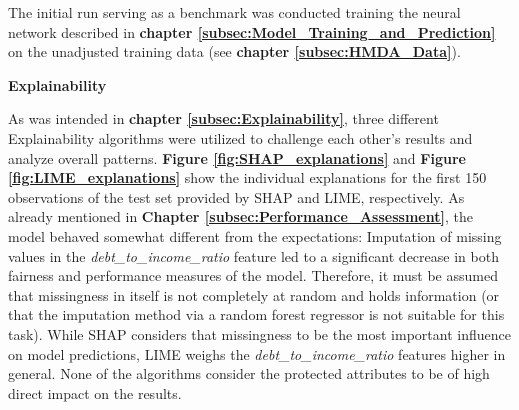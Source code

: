 The initial run serving as a benchmark was conducted training the neural network described in \textbf{chapter \ref{subsec:Model_Training_and_Prediction}} on the unadjusted training data (see \textbf{chapter \ref{subsec:HMDA_Data}}).

\textbf{Explainability}

As was intended in \textbf{chapter \ref{subsec:Explainability}}, three different Explainability algorithms were utilized to challenge each other's results and analyze overall patterns. \textbf{Figure \ref{fig:SHAP_explanations}} and \textbf{Figure \ref{fig:LIME_explanations}} show the individual explanations for the first 150 observations of the test set provided by SHAP and LIME, respectively. 
As already mentioned in \textbf{Chapter \ref{subsec:Performance_Assessment}}, the model behaved somewhat different from the expectations: Imputation of missing values in the \textit{debt\_to\_income\_ratio} feature led to a significant decrease in both fairness and performance measures of the model.
Therefore, it must be assumed that missingness in itself is not completely at random and holds information (or that the imputation method via a random forest regressor is not suitable for this task).
While SHAP considers that missingness to be the most important influence on model predictions, LIME weighs the \textit{debt\_to\_income\_ratio} features higher in general.
None of the algorithms consider the protected attributes to be of high direct impact on the results.

